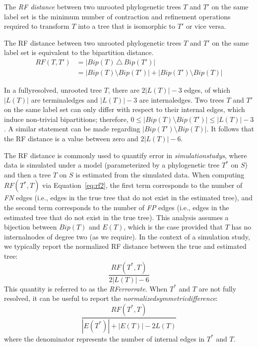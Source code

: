 \begin{definition}
\label{def:rf}
The \emph{\gls{RF} distance} between two unrooted phylogenetic trees $T$ and $T'$ on the same label set is the minimum number of contraction and \gls{refinement} operations required to transform $T$ into a tree that is isomorphic to $T'$ or vice versa.
\end{definition}
\begin{theorem}
\label{thm:rf}
The \gls{RF} distance between two unrooted phylogenetic trees $T$ and $T'$ on the same label set is equivalent to the bipartition distance.
\begin{align}
\label{eq:rf}
	RF(T, T') 
	&= | Bip(T) \, \triangle \, Bip(T') | \\
\label{eq:rf2}
	&= | Bip(T) \setminus Bip(T') | + | Bip(T') \setminus Bip(T) | 
\end{align}
\end{theorem}
In a \gls{fullyresolved}, unrooted tree $T$, there are $2 | L(T) | - 3$ edges, of which $|L(T)|$ are \glspl{terminaledge} and $|L(T)| - 3$ are \glspl{internaledge}.
Two trees $T$ and $T'$ on the same label set can only differ with respect to their internal edges, which induce non-trivial bipartitions; therefore, $0 \le | Bip(T) \setminus Bip(T') | \le |L(T)| - 3$.
A similar statement can be made regarding 
\clearpage
\noindent $| Bip(T') \setminus Bip(T) |$.
It follows that the RF distance is a value between zero and $2 |L(T)| - 6$. 

The RF distance is commonly used to quantify error in \textit{\glspl{simulationstudy}}, where data is simulated under a model (parameterized by a phylogenetic tree $T^*$ on $S$) and then a tree $T$ on $S$ is estimated from the simulated data.
When computing $RF(T^*, T)$ via Equation~\ref{eq:rf2}, the first term corresponds to the number of \textit{\gls{FN}} edges (i.e., edges in the true tree that do not exist in the estimated tree), and the second term corresponds to the number of \textit{\gls{FP}} edges (i.e., edges in the estimated tree that do not exist in the true tree).
This analysis assumes a bijection between $Bip(T)$ and $E(T)$, which is the case provided that $T$ has no \glspl{internalnode} of degree two (as we require).
In the context of a simulation study, we typically report the normalized RF distance between the true and estimated tree:
\begin{equation}
	\label{eq:rf-error}
	\frac{RF(T^*, T)}{2 |L(T)| - 6}
\end{equation}
This quantity is referred to as the \textit{\gls{RFerrorrate}}.
When $T^*$ and $T$ are not fully resolved, it can be useful to report the \textit{\gls{normalizedsymmetricdifference}}:
\begin{equation}
	\label{eq:nsd}
	\frac{RF(T^*, T)}{|E(T^*)| + |E(T)| - 2L(T)}
\end{equation}
where the denominator represents the number of internal edges in $T^*$ and $T$.

